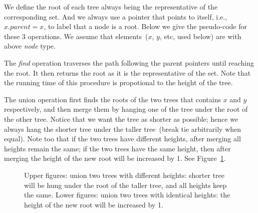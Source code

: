 We define the root of each tree always being the representative of the corresponding set.
And we always use a pointer that points to itself, i.e., $x.parent = x$, to label
that a node is a root.
Below we give the pseudo-code for these 3 operations.
We assume that elements~($x$, $y$, etc, used below) are with above \emph{node} type.

\begin{algorithmblock}[0.8\textwidth]
	\xxx
	\xxx
	\xxx
\end{algorithmblock}

The \emph{find} operation traverses the path following the parent pointers 
until reaching the root. It then returns the root as it is the representative
of the set. Note that the running time of this procedure
is propotional to the height of the tree.

\begin{algorithmblock}[0.8\textwidth]
	\xxx
	\xxx
	\xxx
	\xxx
\end{algorithmblock}

The union operation first finds the roots of the two trees that contains $x$ and
$y$ respectively, and then merge them by hanging one of the tree under the root
of the other tree. Notice that we want the tree as shorter as possible;
hence we always hang the shorter tree under the taller tree~(break tie arbitrarily when equal).
Note too that if the two trees have different heights,
after merging all heights remain the same;
if the two trees have the same height, then after merging
the height of the new root will be increased by 1.
See Figure~\ref{fig:union}.

\begin{algorithmblock}[0.8\textwidth]
	\xxx
	\xxx
	\xxx
	\xxx
	\xxx
	\xxx
	\xxx
	\xxx
	\xxx
	\xxx
	\xxx
\end{algorithmblock}


\begin{figure}[h]
\centering{}
\vspace*{0.4cm}
\centering{}
\caption{Upper figures: union two trees with different heights: shorter tree will
be hung under the root of the taller tree, and all heights keep the same.
Lower figures: union two trees with identical heights: the height of 
	the new root will be increased by 1.}
\label{fig:union}
\end{figure}

